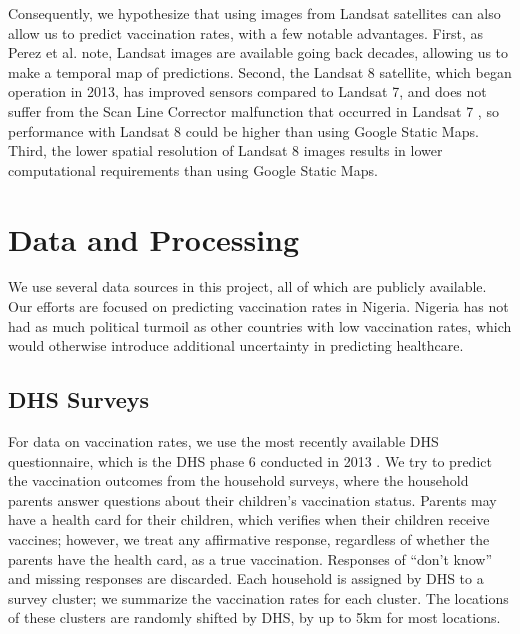 \documentclass[]{article}
\begin{document}
Consequently, we hypothesize that using images from Landsat satellites can also allow us to predict vaccination rates, with a few notable advantages. First, as Perez et al. note, Landsat images are available going back decades, allowing us to make a temporal map of predictions. Second, the Landsat 8 satellite, which began operation in 2013, has improved sensors compared to Landsat 7, and does not suffer from the Scan Line Corrector malfunction that occurred in Landsat 7 \cite{slc2003}, so performance with Landsat 8 could be higher than using Google Static Maps. Third, the lower spatial resolution of Landsat 8 images results in lower computational requirements than using Google Static Maps.

\section{Data and Processing}
We use several data sources in this project, all of which are publicly available. Our efforts are focused on predicting vaccination rates in Nigeria. Nigeria has not had as much political turmoil as other countries with low vaccination rates, which would otherwise introduce additional uncertainty in predicting healthcare.

\subsection{DHS Surveys}
For data on vaccination rates, we use the most recently available DHS questionnaire, which is the DHS phase 6 conducted in 2013 \cite{dhs2014}. We try to predict the vaccination outcomes from the household surveys, where the household parents answer questions about their children's vaccination status. Parents may have a health card for their children, which verifies when their children receive vaccines; however, we treat any affirmative response, regardless of whether the parents have the health card, as a true vaccination. Responses of ``don't know'' and missing responses are discarded. Each household is assigned by DHS to a survey cluster; we summarize the vaccination rates for each cluster. The locations of these clusters are randomly shifted by DHS, by up to 5km for most locations.
\end{document}
